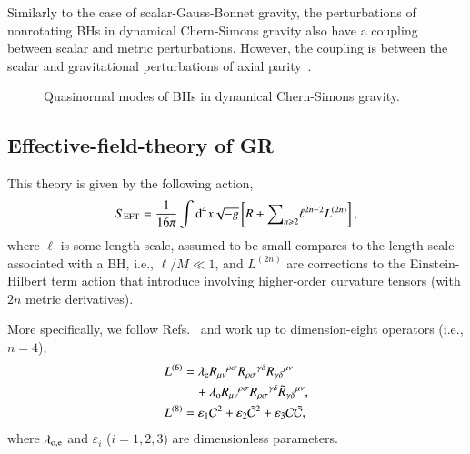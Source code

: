 \documentclass[twocolumn,prd,aps,superscriptaddress,preprintnumbers,tightenlines,showpacs,nofootinbib,eqsecnum,amsfonts,amsmath,longbibliography]{revtex4-1}
\newcommand{\dd}{{\rm d}}
\newcommand{\lame}{\lambda_{\rm e}}
\newcommand{\lamo}{\lambda_{\rm o}}
\begin{document}
Similarly to the case of scalar-Gauss-Bonnet gravity, the perturbations of nonrotating
BHs in dynamical Chern-Simons gravity also have a coupling between scalar and
metric perturbations. However, the coupling is between the scalar and gravitational perturbations
of axial parity~\cite{Yunes:2007ss,Cardoso:2009pk,Molina:2010fb,Wagle:2021tam}.

\begin{figure}
\caption{Quasinormal modes of BHs in dynamical Chern-Simons gravity.}
\end{figure}

\subsection{Effective-field-theory of GR}

This theory is given by the following action,
%
\begin{equation} \label{eq:action_eft}
    S_{\rm EFT} = \frac{1}{16 \pi}
    \int \dd^4x \sqrt{-g}
    \left[ R
    +
    {\sum}_{n \geqslant 2} \ell^{2n - 2} L^{(2n)}
    \right],
\end{equation}
%
where $\ell$ is some length scale, assumed to be small compares to the length
scale associated with a BH, i.e., $\ell / M \ll 1$, and
$L^{(2n)}$ are corrections to the Einstein-Hilbert term action that
introduce involving higher-order curvature tensors (with $2n$ metric
derivatives).

More specifically, we follow Refs.~\cite{Cano:2020cao,Cano:2021myl} and work up
to dimension-eight operators (i.e., $n=4$),
%
\begin{subequations}
\label{eq:action_mods}
\begin{align}
    L^{(6)} &= \lame R_{\mu\nu}{}^{\rho\sigma} R_{\rho\sigma}{}^{\gamma\delta} R_{\gamma \delta}{}^{\mu\nu}
    \nonumber \\
            &\quad + \lamo R_{\mu\nu}{}^{\rho\sigma} R_{\rho\sigma}{}^{\gamma\delta} \tilde{R}_{\gamma \delta}{}^{\mu\nu},
    \label{eq:s_6}
    \\
    L^{(8)} &= \varepsilon_{1} \mathcal{C}^2
    + \varepsilon_{2} \tilde{\mathcal{C}}^{2}
    + \varepsilon_{3} \mathcal{C} \tilde{\mathcal{C}},
\label{eq:s_8}
\end{align}
\end{subequations}
%
where $\lambda_{\rm o, e}$ and $\varepsilon_{i}$ ($i=1,2,3$) are dimensionless parameters.
\end{document}
